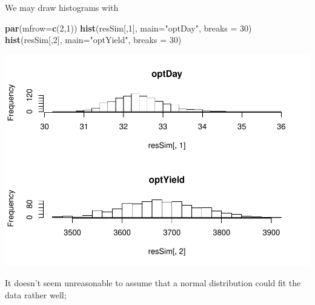 \documentclass[
]{article}
\newenvironment{Shaded}{\begin{snugshade}}{\end{snugshade}}
\newcommand{\DataTypeTok}[1]{\textcolor[rgb]{0.13,0.29,0.53}{#1}}
\newcommand{\DecValTok}[1]{\textcolor[rgb]{0.00,0.00,0.81}{#1}}
\newcommand{\KeywordTok}[1]{\textcolor[rgb]{0.13,0.29,0.53}{\textbf{#1}}}
\newcommand{\NormalTok}[1]{#1}
\newcommand{\StringTok}[1]{\textcolor[rgb]{0.31,0.60,0.02}{#1}}
\begin{document}
We may draw histograms with

\begin{Shaded}
\begin{Highlighting}[]
\KeywordTok{par}\NormalTok{(}\DataTypeTok{mfrow=}\KeywordTok{c}\NormalTok{(}\DecValTok{2}\NormalTok{,}\DecValTok{1}\NormalTok{))}
\KeywordTok{hist}\NormalTok{(resSim[,}\DecValTok{1}\NormalTok{], }\DataTypeTok{main=}\StringTok{"optDay"}\NormalTok{, }\DataTypeTok{breaks =} \DecValTok{30}\NormalTok{)}
\KeywordTok{hist}\NormalTok{(resSim[,}\DecValTok{2}\NormalTok{], }\DataTypeTok{main=}\StringTok{"optYield"}\NormalTok{, }\DataTypeTok{breaks =} \DecValTok{30}\NormalTok{)}
\end{Highlighting}
\end{Shaded}

\begin{center}\includegraphics{matstatproblems20-21_files/figure-latex/unnamed-chunk-59-1} \end{center}

It doesn't seem unreasonable to assume that a normal distribution could
fit the data rather well;
\end{document}
